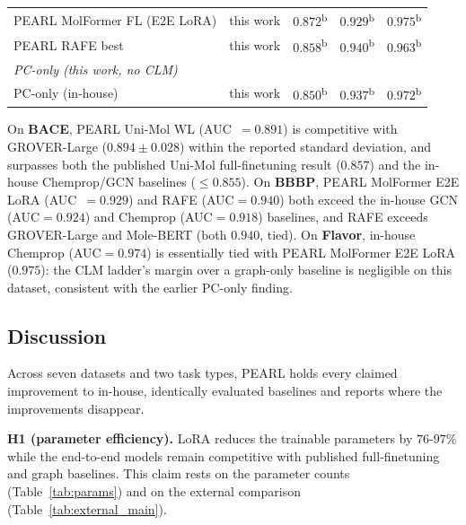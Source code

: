 \documentclass[pdflatex,sn-mathphys-num]{sn-jnl}%
\begin{document}
\begin{table}[!ht]
{\begin{tabular}{llccc}
PEARL MolFormer FL (E2E LoRA) & this work & $0.872$\textsuperscript{b}          & $0.929$\textsuperscript{b} & $\mathbf{0.975}$\textsuperscript{b} \\
PEARL RAFE best               & this work & $0.858$\textsuperscript{b}          & $\mathbf{0.940}$\textsuperscript{b}          & $0.963$\textsuperscript{b} \\
\midrule
\multicolumn{5}{l}{\textit{PC-only (this work, no CLM)}} \\[2pt]
PC-only (in-house)     & this work & $0.850$\textsuperscript{b}          & $0.937$\textsuperscript{b}          & $0.972$\textsuperscript{b} \\
\bottomrule
\end{tabular}
}
\end{table}

On \textbf{BACE}, PEARL Uni-Mol WL (AUC~$=0.891$) is competitive with GROVER-Large ($0.894\pm0.028$) within the reported standard deviation, and surpasses both the published Uni-Mol full-finetuning result ($0.857$) and the in-house Chemprop/GCN baselines ($\le0.855$). On \textbf{BBBP}, PEARL MolFormer E2E LoRA (AUC~$=0.929$) and RAFE (AUC$=0.940$) both exceed the in-house GCN (AUC$=0.924$) and Chemprop (AUC$=0.918$) baselines, and RAFE exceeds GROVER-Large and Mole-BERT (both $0.940$, tied). On \textbf{Flavor}, in-house Chemprop (AUC$=0.974$) is essentially tied with PEARL MolFormer E2E LoRA ($0.975$): the CLM ladder's margin over a graph-only baseline is negligible on this dataset, consistent with the earlier PC-only finding.

\subsection{Discussion}\label{sec:bace_discussion}
Across seven datasets and two task types, PEARL holds every claimed improvement to in-house, identically evaluated baselines and reports where the improvements disappear.

\textbf{H1 (parameter efficiency).} LoRA reduces the trainable parameters by $76$-$97\%$ while the end-to-end models remain competitive with published full-finetuning and graph baselines. This claim rests on the parameter counts (Table~\ref{tab:params}) and on the external comparison (Table~\ref{tab:external_main}).
\end{document}
